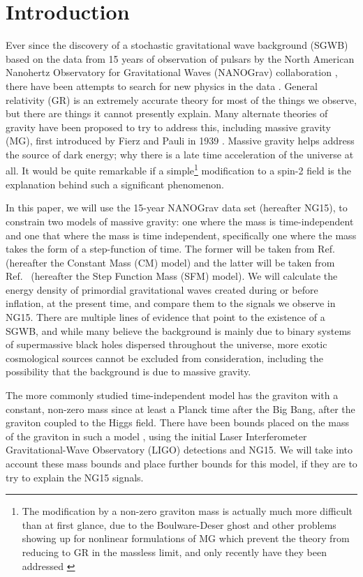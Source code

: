 \documentclass[prd,twocolumn,aps,psfig,nofootinbib,nobibnotes,superscriptaddress,preprintnumbers,times]{revtex4-2}
\begin{document}
\section{Introduction}
Ever since the discovery of a stochastic gravitational wave background (SGWB) based on the data from 15 years of observation of pulsars by the North American Nanohertz Observatory for Gravitational Waves (NANOGrav) collaboration \cite{Agazie:2023}, there have been attempts to search for new physics in the data \cite{Afzal:2023}. General relativity (GR) is an extremely accurate theory for most of the things we observe, but there are things it cannot presently explain. Many alternate theories of gravity have been proposed to try to address this, including massive gravity (MG), first introduced by Fierz and Pauli in 1939 \cite{Fierz:1939ix}. Massive gravity helps address the source of dark energy; why there is a late time acceleration of the universe at all. It would be quite remarkable if a simple\footnote{The modification by a non-zero graviton mass is actually much more difficult than at first glance, due to the Boulware-Deser ghost and other problems showing up for nonlinear formulations of MG which prevent the theory from reducing to GR in the massless limit, and only recently have they been addressed \cite{Hassan:2012a, Hassan:2012b}} modification to a spin-2 field is the explanation behind such a significant phenomenon. 

In this paper, we will use the 15-year NANOGrav data set (hereafter NG15), to constrain two models of massive gravity: one where the mass is time-independent and one that where the mass is time independent, specifically one where the mass takes the form of a step-function of time. The former will be taken from Ref.\ \cite{Gumrukcuoglu:2012} (hereafter the Constant Mass (CM) model) and the latter will be taken from Ref.\ \cite{Fujita:2018} (hereafter the Step Function Mass (SFM) model). We will calculate the energy density of primordial gravitational waves created during or before inflation, at the present time, and compare them to the signals we observe in NG15. There are multiple lines of evidence that point to the existence of a SGWB, and while many believe the background is mainly due to binary systems of supermassive black holes dispersed throughout the universe, more exotic cosmological sources cannot be excluded  from consideration\cite{Agazie:2023}, including the possibility that the background is due to massive gravity. 
    
The more commonly studied time-independent model has the graviton with a constant, non-zero mass since at least a Planck time after the Big Bang, after the graviton coupled to the Higgs field. There have been bounds placed on the mass of the graviton in such a model \cite{deRham:2017,Wang:2023, Wu:2023}, using the initial Laser Interferometer Gravitational-Wave Observatory (LIGO) detections and NG15. We will take into account these mass bounds and place further bounds for this model, if they are to try to explain the NG15 signals.
\end{document}

